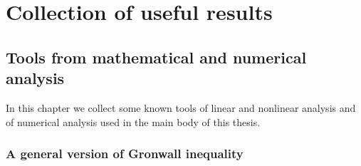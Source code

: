 \documentclass[a4paper,10pt,oneside]{amsbook}
\numberwithin{section}{chapter}
\numberwithin{equation}{chapter}
\theoremstyle{definition}
\begin{document}
%

\appendix
\part*{Collection of useful results}

\chapter{Tools from mathematical and numerical analysis}
\label{chap:tools-math}

In this chapter we collect some known tools of linear and nonlinear analysis and of numerical analysis used in the main body of this thesis.

\section{A general version of Gronwall inequality}
\end{document}
